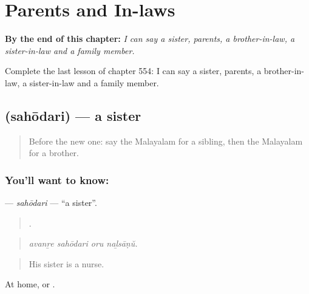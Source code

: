 
\chapter{Parents and In-laws}
\label{ch:ml-parents-and-in-laws}

\begin{chapteropening}
\textbf{By the end of this chapter:} \emph{I can say a sister, parents, a brother-in-law, a sister-in-law and a family member.}

Complete the last lesson of chapter 554: I can say a sister, parents, a brother-in-law, a sister-in-law and a family member.
\end{chapteropening}

\section[\texorpdfstring{\ml{സഹോദരി} (sahōdari)}{സഹോദരി (sahōdari)}]{ (sahōdari) — a sister}

\label{lesson:ML-C554-sahodari}



\begin{quote}
Before the new one: say the Malayalam for a sibling, then the Malayalam for a brother.
\end{quote}

\subsection*{You'll want to know: }
\textbf{} — \emph{sahōdari} — \textquotedblleft{}a sister\textquotedblright{}.

\begin{quote}
   .
\end{quote}

\begin{quote}
\emph{avanṟe sahōdari oru naḻsāṇŭ.}
\end{quote}

\begin{quote}
His sister is a nurse.
\end{quote}

At home,  or .

